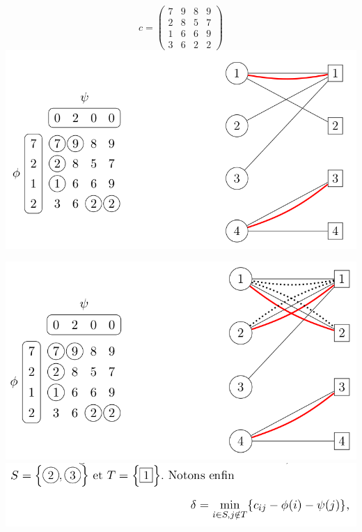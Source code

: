 \documentclass{beamer}
\theoremstyle{definition}
\begin{document}
\begin{frame}$$c= \begin{pmatrix}	7&9&8&9\\	2&8&5&7\\	1&6&6&9\\	3&6&2&2	\end{pmatrix}$$
\centering \includegraphics[scale=0.3]{z1.png}
\end{frame}
\begin{frame}
	\centering \includegraphics[scale=0.35]{z2.png}
	\includegraphics[scale=0.3]{z4.png}
\end{frame}
\end{document}
